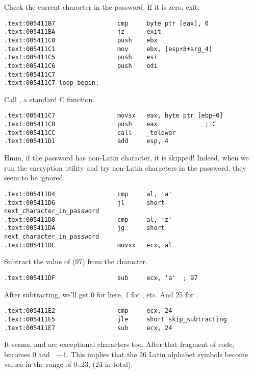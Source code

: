 Check the current character in the password. If it is zero, exit:

\begin{lstlisting}[style=customasmx86]
.text:005411B7                 cmp     byte ptr [eax], 0
.text:005411BA                 jz      exit
.text:005411C0                 push    ebx
.text:005411C1                 mov     ebx, [esp+8+arg_4]
.text:005411C5                 push    esi
.text:005411C6                 push    edi
.text:005411C7
.text:005411C7 loop_begin:
\end{lstlisting}

Call , a standard C function.

\begin{lstlisting}[style=customasmx86]
.text:005411C7                 movsx   eax, byte ptr [ebp+0]
.text:005411CB                 push    eax             ; C
.text:005411CC                 call    _tolower
.text:005411D1                 add     esp, 4
\end{lstlisting}

Hmm, if the password has non-Latin character, it is skipped! 
Indeed, when we run the encryption utility and try non-Latin characters in the password, 
they seem to be ignored.

\begin{lstlisting}[style=customasmx86]
.text:005411D4                 cmp     al, 'a'
.text:005411D6                 jl      short next_character_in_password
.text:005411D8                 cmp     al, 'z'
.text:005411DA                 jg      short next_character_in_password
.text:005411DC                 movsx   ecx, al
\end{lstlisting}

Subtract the value of  (97) from the character.

\begin{lstlisting}[style=customasmx86]
.text:005411DF                 sub     ecx, 'a'  ; 97
\end{lstlisting}

After subtracting, we'll get 0 for  here, 1 for , etc. And 25 for .

\begin{lstlisting}[style=customasmx86]
.text:005411E2                 cmp     ecx, 24
.text:005411E5                 jle     short skip_subtracting
.text:005411E7                 sub     ecx, 24
\end{lstlisting}

It seems,  and  are exceptional characters too. 
After that fragment of code,  becomes 0 and ~---1. 
This implies that the 26 Latin alphabet symbols become values in the range of 0..23, (24 in total).

